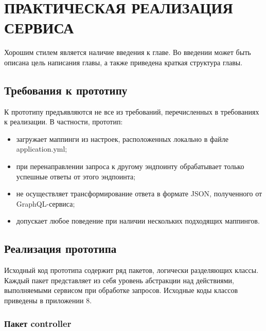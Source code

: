 \chapter{ПРАКТИЧЕСКАЯ РЕАЛИЗАЦИЯ СЕРВИСА}\label{ch:ch3}


Хорошим стилем является наличие введения к главе.
Во введении может быть описана цель написания главы, а также приведена краткая структура главы.
	
\section{Требования к прототипу}\label{ch3:sec1}

К прототипу предъявляются не все из требований, перечисленных в требованиях к реализации.
В частности, прототип:

\begin{itemize}
	\item загружает маппинги из настроек, расположенных локально в файле application.yml;
	\item при перенаправлении запроса к другому эндпоинту обрабатывает только успешные ответы от этого эндпоинта;
	\item не осуществляет трансформирование ответа в формате JSON, полученного от GraphQL-сервиса;
	\item допускает любое поведение при наличии нескольких подходящих маппингов.
\end{itemize}

\section{Реализация прототипа}\label{ch3:sec2}

Исходный код прототипа содержит ряд пакетов, логически разделяющих классы.
Каждый пакет представляет из себя уровень абстракции над действиями, выполняемыми сервисом при обработке запросов.
Исходные коды классов приведены в приложении 8.

\subsection{Пакет controller}

